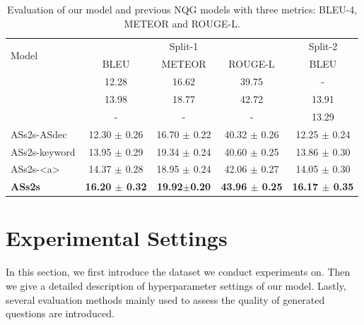 \documentclass[letterpaper]{article} %
\newcommand\Tstrut{\rule{0pt}{2.3ex}}         %
\begin{document}
\begin{table}[!htb]
\centering
\begin{tabular}{|l|ccc|c|}
\hline
\multirow{2}{*}{Model} & \multicolumn{3}{c|}{Split-1} & Split-2\Tstrut  \\ \cline{2-5}
 & BLEU & METEOR & ROUGE-L & BLEU\Tstrut \\  \hline
\cite{du2017learning} & 12.28 & 16.62 & 39.75 & - \Tstrut  \\
\cite{song2018leveraging} & 13.98 & 18.77 & 42.72 & 13.91  \\
\cite{zhou2017neural} & - & - & - & 13.29  \\ \hline
ASs2s-ASdec & 12.30 $\pm$ 0.26 & 16.70 $\pm$ 0.22 & 40.32 $\pm$ 0.26 & 12.25 $\pm$ 0.24 \Tstrut \\
ASs2s-keyword & 13.95 $\pm$ 0.29 & 19.34 $\pm$ 0.24 & 40.60 $\pm$ 0.25& 13.86 $\pm$ 0.30 \Tstrut \\
ASs2s-\textless a\textgreater{} & 14.37 $\pm$ 0.28 & 18.95 $\pm$ 0.24 & 42.06 $\pm$ 0.27 & 14.05 $\pm$ 0.30\Tstrut  \\
\textbf{ASs2s} & \textbf{16.20 $\pm$ 0.32} & \textbf{19.92$\pm$0.20} & \textbf{43.96 $\pm$ 0.25} & \textbf{16.17 $\pm$ 0.35}\Tstrut  \\
\hline
\end{tabular}%
\caption{Evaluation of our model and previous NQG models with three metrics: BLEU-4, METEOR and ROUGE-L.}
\label{table:evaluation}
\end{table}


\section{Experimental Settings}
In this section, we first introduce the dataset we conduct experiments on. Then we give a detailed description of hyperparameter settings of our model. Lastly, several evaluation methods mainly used to assess the quality of generated questions are introduced.
\end{document}
